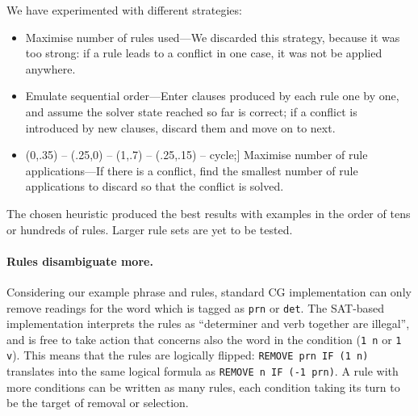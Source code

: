 \documentclass[11pt]{article}
\newcommand{\todo}[1]{{\color{cyan}\textbf{[TODO: }#1\textbf{]}}}
\def\checkmark{\tikz\fill[scale=0.4](0,.35) -- (.25,0) -- (1,.7) --
  (.25,.15) -- cycle;}
\begin{document}
We have experimented with different strategies:
\begin{itemize}
\item Maximise
number of rules used---We discarded this strategy, because it was too strong: if a rule leads to a conflict in one case, it was not be applied anywhere.
\item Emulate sequential order---Enter clauses produced by each rule one by one, and assume the solver state reached so far is correct; if a conflict is introduced by new clauses, discard them and move on to next.
\item [\checkmark] Maximise number of rule applications---If there is a conflict, find the smallest number of rule applications to discard so that the conflict is solved.
\end{itemize}
The chosen heuristic produced the best results with examples in the order of tens or hundreds of rules.
Larger rule sets are yet to be tested.


\paragraph{Rules disambiguate more.}
Considering our example phrase and rules, standard CG implementation
can only remove readings for the word which is tagged as \texttt{prn} or
\texttt{det}. The SAT-based implementation interprets the rules as
``determiner and verb together are illegal'', and is free to take action that concerns also the word in the condition (\texttt{1 n} or \texttt{1 v}).
This means that the rules are logically flipped: \texttt{REMOVE prn IF
  (1 n)} translates into the same logical formula as  \texttt{REMOVE n
  IF (-1 prn)}. A rule with more conditions can be written as many
rules, each condition taking its turn to be the target of removal or selection. \\

\end{document}

